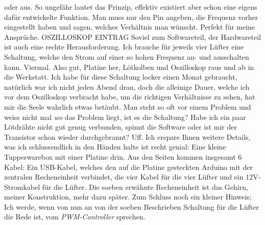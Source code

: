 \documentclass[12pt,titlepage,a4paper]{article}
\begin{document}
oder aus. So ungefähr lautet das Prinzip, effektiv existiert aber schon eine eigens dafür entwickelte Funktion. Man muss nur den Pin angeben, die Frequenz vorher eingestellt haben und sagen, welches Verhältnis man wünscht. Perfekt für meine Ansprüche. 
OSZILLOSKOP EINTRAG
Soviel zum Softwareteil, der Hardwareteil ist auch eine rechte Herausforderung. Ich brauche für jeweils vier Lüfter eine Schaltung, welche den Strom auf einer so hohen Frequenz an- und ausschalten kann. Viermal. Also gut, Platine her, Lötkolben und Oszilloskop raus und ab in die Werkstatt. Ich habe für diese Schaltung locker einen Monat gebraucht, natürlich war ich nicht jeden Abend dran, doch die alleinige Dauer, welche ich vor dem Oszilloskop verbracht habe, um die richtigen Verhältnisse zu sehen, hat mir die Seele wahrlich etwas betäubt. Man steht so oft vor einem Problem und weiss nicht mal \textit{wo} das Problem liegt, ist es die Schaltung? Habe ich ein paar Lötdrähte nicht gut genug verbunden, spinnt die Software oder ist mir der Transistor schon wieder durchgebrannt? Uff. Ich erspare Ihnen weitere Details, was ich schlussendlich in den Händen halte ist recht genial: Eine kleine Tupperwarebox mit einer Platine drin. Aus den Seiten kommen insgesamt 6 Kabel: Ein USB-Kabel, welches den auf die Platine gesteckten Arduino mit der zentralen Recheneinheit verbindet, die vier Kabel für die vier Lüfter und ein 12V-Stromkabel für die Lüfter. \n Die soeben erwähnte Recheneinheit ist das Gehirn, meiner Konstruktion, mehr dazu später. Zum Schluss noch ein kleiner Hinweis; Ich werde, wenn von nun an von der soeben Beschrieben Schaltung für die Lüfter die Rede ist, vom \textit{PWM-Controller} sprechen.
\end{document}
